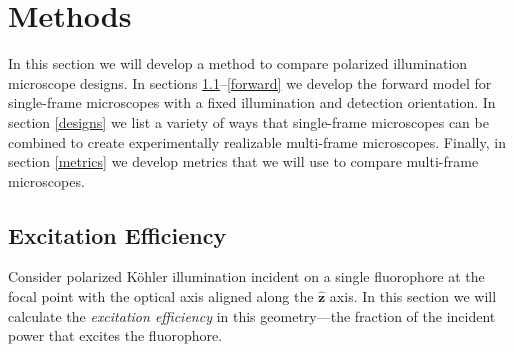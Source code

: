 \documentclass[10pt]{article}
\providecommand{\mh}[1]{\mathbf{\hat{#1}}}
\begin{document}




\section{Methods}
In this section we will develop a method to compare polarized illumination
microscope designs. In sections \ref{excitation}--\ref{forward} we develop the
forward model for single-frame microscopes with a fixed illumination and
detection orientation. In section \ref{designs} we list a variety of ways that
single-frame microscopes can be combined to create experimentally realizable
multi-frame microscopes. Finally, in section \ref{metrics} we develop metrics
that we will use to compare multi-frame microscopes.

\subsection{Excitation Efficiency}\label{excitation}
Consider polarized K\"ohler illumination incident on a single fluorophore at the
focal point with the optical axis aligned along the $\mh{z}$ axis. In this section we
will calculate the \emph{excitation efficiency} in this geometry---the fraction
of the incident power that excites the fluorophore.
\end{document}
